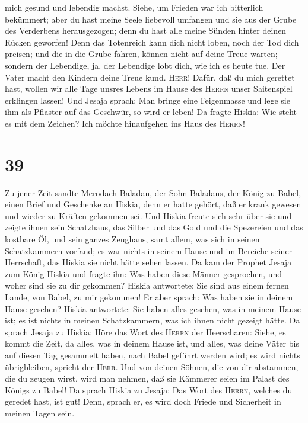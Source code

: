 mich gesund und lebendig machst.  Siehe, um Frieden war
ich bitterlich bekümmert; aber du hast meine Seele liebevoll umfangen
und sie aus der Grube des Verderbens herausgezogen; denn du hast alle
meine Sünden hinter deinen Rücken geworfen!  Denn das
Totenreich kann dich nicht loben, noch der Tod dich preisen; und die in
die Grube fahren, können nicht auf deine Treue warten; 
sondern der Lebendige, ja, der Lebendige lobt dich, wie ich es heute
tue. Der Vater macht den Kindern deine Treue kund. 
\textsc{Herr}! Dafür, daß du mich gerettet hast, wollen wir alle Tage
unsres Lebens im Hause des \textsc{Herrn} unser Saitenspiel erklingen
lassen!  Und Jesaja sprach: Man bringe eine Feigenmasse
und lege sie ihm als Pflaster auf das Geschwür, so wird er leben!
 Da fragte Hiskia: Wie steht es mit dem Zeichen? Ich
möchte hinaufgehen ins Haus des \textsc{Herrn}!

\hypertarget{section-38}{%
\section{39}\label{section-38}}

 Zu jener Zeit sandte Merodach Baladan, der Sohn Baladans,
der König zu Babel, einen Brief und Geschenke an Hiskia, denn er hatte
gehört, daß er krank gewesen und wieder zu Kräften gekommen sei.
 Und Hiskia freute sich sehr über sie und zeigte ihnen
sein Schatzhaus, das Silber und das Gold und die Spezereien und das
kostbare Öl, und sein ganzes Zeughaus, samt allem, was sich in seinen
Schatzkammern vorfand; es war nichts in seinem Hause und im Bereiche
seiner Herrschaft, das Hiskia sie nicht hätte sehen lassen.
 Da kam der Prophet Jesaja zum König Hiskia und fragte
ihn: Was haben diese Männer gesprochen, und woher sind sie zu dir
gekommen? Hiskia antwortete: Sie sind aus einem fernen Lande, von Babel,
zu mir gekommen!  Er aber sprach: Was haben sie in deinem
Hause gesehen? Hiskia antwortete: Sie haben alles gesehen, was in meinem
Hause ist; es ist nichts in meinen Schatzkammern, was ich ihnen nicht
gezeigt hätte.  Da sprach Jesaja zu Hiskia: Höre das Wort
des \textsc{Herrn} der Heerscharen:  Siehe, es kommt die
Zeit, da alles, was in deinem Hause ist, und alles, was deine Väter bis
auf diesen Tag gesammelt haben, nach Babel geführt werden wird; es wird
nichts übrigbleiben, spricht der \textsc{Herr}.  Und von
deinen Söhnen, die von dir abstammen, die du zeugen wirst, wird man
nehmen, daß sie Kämmerer seien im Palast des Königs zu Babel!
 Da sprach Hiskia zu Jesaja: Das Wort des \textsc{Herrn},
welches du geredet hast, ist gut! Denn, sprach er, es wird doch Friede
und Sicherheit in meinen Tagen sein.

